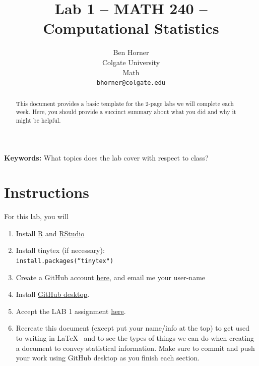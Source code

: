 \documentclass{article}\usepackage[]{graphicx}\usepackage[]{xcolor}
\begin{document}
\vspace{-1in}
\title{Lab 1 -- MATH 240 -- Computational Statistics}

\author{
  Ben Horner \\
  Colgate University  \\
  Math  \\
  {\tt bhorner@colgate.edu}
}

\date{}

\maketitle

\begin{multicols}{2}
\begin{abstract}
This document provides a basic template for the 2-page labs we will complete each week. Here, you should provide a succinct summary about what you did and why it might be helpful.
\end{abstract}

\noindent \textbf{Keywords:} What topics does the lab cover with respect to class?

\section{Instructions}
For this lab, you will
\begin{enumerate}[1.]\itemsep0em
\item Install \href{https://cran.rstudio.com/}{R} and \href{https://posit.co/download/rstudio-desktop/}{RStudio}
\item Install tinytex (if necessary):\\
\texttt{install.packages(``tinytex")}
\item Create a GitHub account \href{https://github.com/}{here}, and email me your user-name
\item Install \href{https://github.com/apps/desktop}{GitHub desktop}.
\item Accept the LAB 1 assignment \href{https://classroom.github.com/assignment-invitations/49ec7c38806e92bfef8bf3094b9b11d3}{here}.
\item Recreate this document (except put your name/info at the top) to get used to writing in \LaTeX~ and to see the types of things we can do when creating a document to convey statistical information. Make sure to commit and push your work using GitHub desktop as you finish each section.
\end{enumerate}


\end{multicols}
\end{document}
